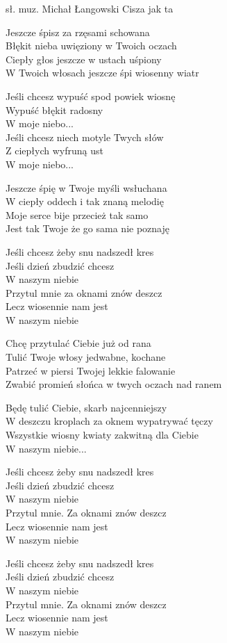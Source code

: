 {sł. muz. Michał Łangowski}
{Cisza jak ta}
\begin{text}
    \hfill\break
Jeszcze śpisz za rzęsami schowana \\
Błękit nieba uwięziony w Twoich oczach \\
Ciepły głos jeszcze w ustach uśpiony \\
W Twoich włosach jeszcze śpi wiosenny wiatr

\vin Jeśli chcesz wypuść spod powiek wiosnę \\
\vin Wypuść błękit radosny \\
\vin W moje niebo... \\
\vin Jeśli chcesz niech motyle Twych słów \\
\vin Z ciepłych wyfruną ust \\
\vin W moje niebo...

    \hfill\break
Jeszcze śpię w Twoje myśli wsłuchana \\
W ciepły oddech i tak znaną melodię \\
Moje serce bije przecież tak samo \\
Jest tak Twoje że go sama nie poznaję

\vin Jeśli chcesz żeby snu nadszedł kres \\
\vin Jeśli dzień zbudzić chcesz \\
\vin W naszym niebie \\
\vin Przytul mnie za oknami znów deszcz \\
\vin Lecz wiosennie nam jest \\
\vin W naszym niebie

    \hfill\break
Chcę przytulać Ciebie już od rana \\
Tulić Twoje włosy jedwabne, kochane \\
Patrzeć w piersi Twojej lekkie falowanie \\
Zwabić promień słońca w twych oczach nad ranem

Będę tulić Ciebie, skarb najcenniejszy \\
W deszczu kroplach za oknem wypatrywać tęczy \\
Wszystkie wiosny kwiaty zakwitną dla Ciebie \\
W naszym niebie...

\vin Jeśli chcesz żeby snu nadszedł kres \\
\vin Jeśli dzień zbudzić chcesz \\
\vin W naszym niebie \\
\vin Przytul mnie. Za oknami znów deszcz \\
\vin Lecz wiosennie nam jest \\
\vin W naszym niebie

\vin Jeśli chcesz żeby snu nadszedł kres \\
\vin Jeśli dzień zbudzić chcesz \\
\vin W naszym niebie \\
\vin Przytul mnie. Za oknami znów deszcz \\
\vin Lecz wiosennie nam jest \\
\vin W naszym niebie
\end{text}
